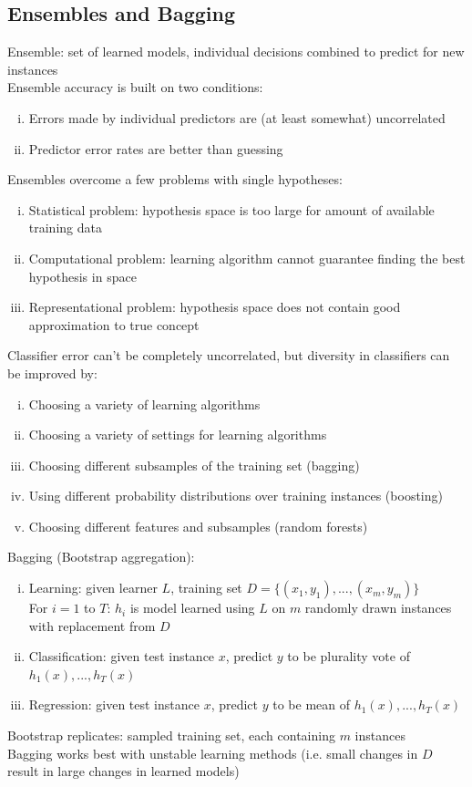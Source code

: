 \documentclass{article}
\begin{document}
		\subsection{Ensembles and Bagging}
			Ensemble: set of learned models, individual decisions combined to predict for new instances \\
			Ensemble accuracy is built on two conditions:
			\begin{enumerate}[(i)]
				\item Errors made by individual predictors are (at least somewhat) uncorrelated
				\item Predictor error rates are better than guessing
				\end{enumerate}
			Ensembles overcome a few problems with single hypotheses:
			\begin{enumerate}[(i)]
				\item Statistical problem: hypothesis space is too large for amount of available training data
				\item Computational problem: learning algorithm cannot guarantee finding the best hypothesis in space
				\item Representational problem: hypothesis space does not contain good approximation to true concept
				\end{enumerate}
			Classifier error can't be completely uncorrelated, but diversity in classifiers can be improved by:
			\begin{enumerate}[(i)]
				\item Choosing a variety of learning algorithms
				\item Choosing a variety of settings for learning algorithms
				\item Choosing different subsamples of the training set (bagging)
				\item Using different probability distributions over training instances (boosting)
				\item Choosing different features and subsamples (random forests)
				\end{enumerate}
			Bagging (Bootstrap aggregation):
			\begin{enumerate}[(i)]
				\item Learning: given learner $L$, training set $D = \{(x_1, y_1), ..., (x_m, y_m)\}$ \\
				For $i = 1$ to $T$: $h_i$ is model learned using $L$ on $m$ randomly drawn instances with replacement from $D$
				\item Classification: given test instance $x$, predict $y$ to be plurality vote of $h_1(x), ..., h_T(x)$
				\item Regression: given test instance $x$, predict $y$ to be mean of $h_1(x), ..., h_T(x)$
 				\end{enumerate}
 			Bootstrap replicates: sampled training set, each containing $m$ instances \\
 			Bagging works best with unstable learning methods (i.e. small changes in $D$ result in large changes in learned models) \\
\end{document}
